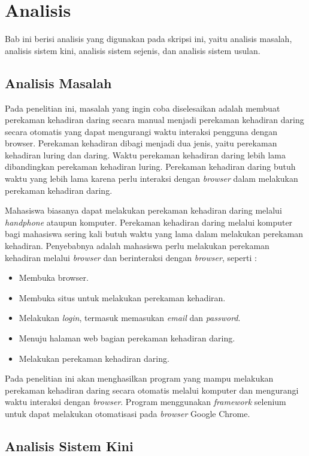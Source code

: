 \chapter{Analisis}
\label{chap:analisis}
Bab ini berisi analisis yang digunakan pada skripsi ini, yaitu analisis masalah, analisis sistem kini, analisis sistem sejenis, dan analisis sistem usulan.

\section{Analisis Masalah}
\label{sec:masalah}
Pada penelitian ini, masalah yang ingin coba diselesaikan adalah membuat perekaman kehadiran daring secara manual menjadi perekaman kehadiran daring secara otomatis yang dapat mengurangi waktu interaksi pengguna dengan browser. Perekaman kehadiran dibagi menjadi dua jenis, yaitu perekaman kehadiran luring dan daring. Waktu perekaman kehadiran daring lebih lama dibandingkan perekaman kehadiran luring. Perekaman kehadiran daring butuh waktu yang lebih lama karena perlu interaksi dengan \textit{browser} dalam melakukan perekaman kehadiran daring. 

Mahasiswa biasanya dapat melakukan perekaman kehadiran daring melalui \textit{handphone} ataupun komputer. Perekaman kehadiran daring melalui komputer bagi mahasiswa sering kali butuh waktu yang lama dalam melakukan perekaman kehadiran. Penyebabnya adalah mahasiswa perlu melakukan perekaman kehadiran melalui \textit{browser} dan berinteraksi dengan \textit{browser}, seperti :
\begin{itemize}
	\item Membuka browser.
	\item Membuka situs untuk melakukan perekaman kehadiran.
	\item Melakukan \textit{login}, termasuk memasukan \textit{email} dan \textit{password}.
	\item Menuju halaman web bagian perekaman kehadiran daring.
	\item Melakukan perekaman kehadiran daring. 
\end{itemize}  
Pada penelitian ini akan menghasilkan program yang mampu melakukan perekaman kehadiran daring secara otomatis melalui komputer dan mengurangi waktu interaksi dengan \textit{browser}. Program menggunakan \textit{framework} selenium untuk dapat melakukan otomatisasi pada \textit{browser} Google Chrome.


\section{Analisis Sistem Kini}

